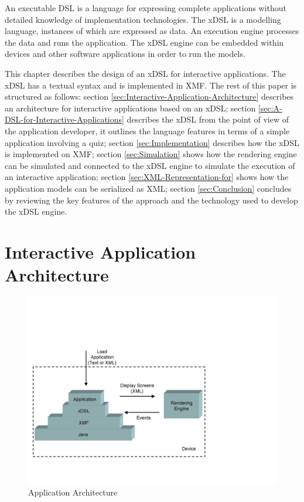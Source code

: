 An executable DSL is a language for expressing complete applications
without detailed knowledge of implementation technologies. The xDSL
is a modelling language, instances of which are expressed as data.
An execution engine processes the data and runs the application. The
xDSL engine can be embedded within devices and other software applications
in order to run the models.

This chapter describes the design of an xDSL for interactive applications.
The xDSL has a textual syntax and is implemented in XMF. The rest
of this paper is structured as follows: section \ref{sec:Interactive-Application-Architecture}
describes an architecture for interactive applications based on an
xDSL; section \ref{sec:A-DSL-for-Interactive-Applications} describes
the xDSL from the point of view of the application developer, it outlines
the language features in terms of a simple application involving a
quiz; section \ref{sec:Implementation} describes how the xDSL is
implemented on XMF; section \ref{sec:Simulation} shows how the rendering
engine can be simulated and connected to the xDSL engine to simulate
the execution of an interactive application; section \ref{sec:XML-Representation-for}
shows how the application models can be serialized as XML; section
\ref{sec:Conclusion} concludes by reviewing the key features of the
approach and the technology used to develop the xDSL engine.


\section{Interactive Application Architecture\label{sec:Interactive-Application-Architecture}}

%
\begin{figure}
\begin{center}

\includegraphics[width=12cm]{LanguageEngineering/Interactive/Images/Architecture}

\caption{Application Architecture\label{fig:Application-Architecture}}

\end{center}
\end{figure}


